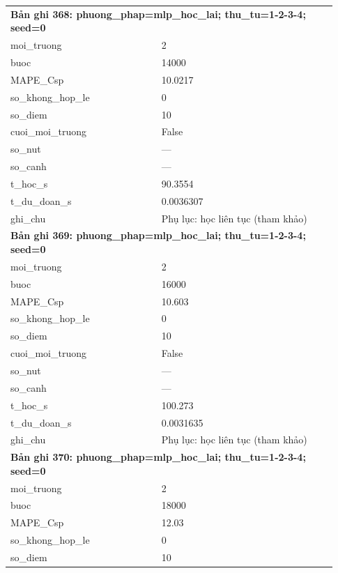 \begin{longtable}{p{0.43\linewidth}p{0.50\linewidth}}
\midrule
\multicolumn{2}{p{0.95\linewidth}}{\textbf{Bản ghi 368: phuong\_phap=mlp\_hoc\_lai; thu\_tu=1-2-3-4; seed=0}} \\
moi\_\allowbreak truong & 2 \\
buoc & 14000 \\
MAPE\_\allowbreak Csp & 10.0217 \\
so\_\allowbreak khong\_\allowbreak hop\_\allowbreak le & 0 \\
so\_\allowbreak diem & 10 \\
cuoi\_\allowbreak moi\_\allowbreak truong & False \\
so\_\allowbreak nut & — \\
so\_\allowbreak canh & — \\
t\_\allowbreak hoc\_\allowbreak s & 90.3554 \\
t\_\allowbreak du\_\allowbreak doan\_\allowbreak s & 0.0036307 \\
ghi\_\allowbreak chu & Phụ lục: học liên tục (tham khảo) \\
\midrule
\multicolumn{2}{p{0.95\linewidth}}{\textbf{Bản ghi 369: phuong\_phap=mlp\_hoc\_lai; thu\_tu=1-2-3-4; seed=0}} \\
moi\_\allowbreak truong & 2 \\
buoc & 16000 \\
MAPE\_\allowbreak Csp & 10.603 \\
so\_\allowbreak khong\_\allowbreak hop\_\allowbreak le & 0 \\
so\_\allowbreak diem & 10 \\
cuoi\_\allowbreak moi\_\allowbreak truong & False \\
so\_\allowbreak nut & — \\
so\_\allowbreak canh & — \\
t\_\allowbreak hoc\_\allowbreak s & 100.273 \\
t\_\allowbreak du\_\allowbreak doan\_\allowbreak s & 0.0031635 \\
ghi\_\allowbreak chu & Phụ lục: học liên tục (tham khảo) \\
\midrule
\multicolumn{2}{p{0.95\linewidth}}{\textbf{Bản ghi 370: phuong\_phap=mlp\_hoc\_lai; thu\_tu=1-2-3-4; seed=0}} \\
moi\_\allowbreak truong & 2 \\
buoc & 18000 \\
MAPE\_\allowbreak Csp & 12.03 \\
so\_\allowbreak khong\_\allowbreak hop\_\allowbreak le & 0 \\
so\_\allowbreak diem & 10 \\

\end{longtable}
